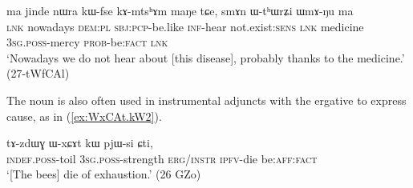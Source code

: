   \begin{exe}
\ex \label{ex:smAn.WthWrZi}
\gll   ma jinde nɯra kɯ-fse kɤ-mtsʰɤm maŋe tɕe, smɤn ɯ-tʰɯrʑi ɯmɤ-ŋu ma \\
\textsc{lnk} nowadays \textsc{dem}:\textsc{pl} \textsc{sbj}:\textsc{pcp}-be.like \textsc{inf}-hear not.exist:\textsc{sens} \textsc{lnk} medicine   \textsc{3sg}.\textsc{poss}-mercy \textsc{prob}-be:\textsc{fact} \textsc{lnk} \\
\glt `Nowadays we do not hear about [this disease], probably thanks to the medicine.' (27-tWfCAl)
  \end{exe}  

The noun  is also often used in instrumental adjuncts with the ergative to express cause, as in (\ref{ex:WxCAt.kW2}).


  \begin{exe}
\ex \label{ex:WxCAt.kW2}
\gll   tɤ-zdɯɣ ɯ-xɕɤt kɯ pjɯ-si ɕti, \\
  \textsc{indef}.\textsc{poss}-toil  \textsc{3sg}.\textsc{poss}-strength \textsc{erg/instr} \textsc{ipfv}-die be:\textsc{aff}:\textsc{fact} \\
 \glt `[The bees] die of exhaustion.' (26 GZo) 
  \end{exe}

